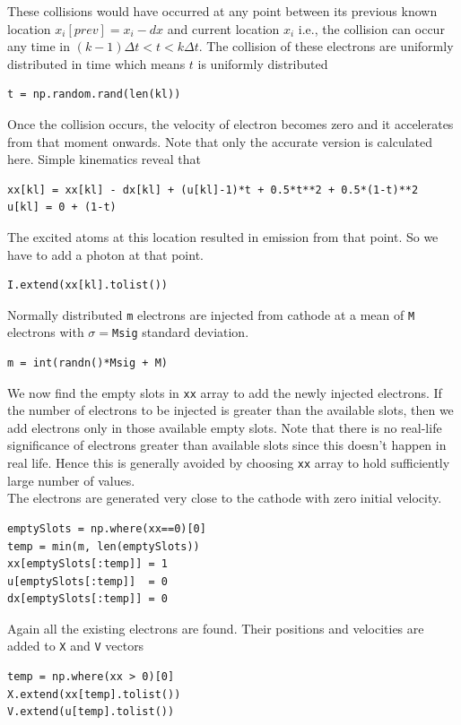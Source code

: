 \documentclass[12pt, a4paper]{report}
\begin{document}
These collisions would have occurred at any point between its previous known location $x_i[prev] = x_i - dx$ and current location $x_i$ i.e., the collision can occur any time in $(k-1) \Delta t < t < k \Delta t$. The collision of these electrons are uniformly distributed in time which means $t$ is uniformly distributed
\begin{verbatim}
t = np.random.rand(len(kl)) 
\end{verbatim}
Once the collision occurs, the velocity of electron becomes zero and it accelerates from that moment onwards. Note that only the accurate version is calculated here. Simple kinematics reveal that
\begin{verbatim}
xx[kl] = xx[kl] - dx[kl] + (u[kl]-1)*t + 0.5*t**2 + 0.5*(1-t)**2
u[kl] = 0 + (1-t)
\end{verbatim}
The excited atoms at this location resulted in emission from that point. So we have to add a photon at that point. 
\begin{verbatim}
I.extend(xx[kl].tolist())
\end{verbatim}
Normally distributed \texttt{m} electrons are injected from cathode at a mean of \texttt{M} electrons with $\sigma = $\texttt{Msig} standard deviation.
\begin{verbatim}
m = int(randn()*Msig + M)
\end{verbatim}
We now find the empty slots in \texttt{xx} array to add the newly injected electrons. If the number of electrons to be injected is greater than the available slots, then we add electrons only in those available empty slots. Note that there is no real-life significance of electrons greater than available slots since this doesn't happen in real life. Hence this is generally avoided by choosing \texttt{xx} array to hold sufficiently large number of values.\\
The electrons are generated very close to the cathode with zero initial velocity. 
\begin{verbatim}
emptySlots = np.where(xx==0)[0]
temp = min(m, len(emptySlots))
xx[emptySlots[:temp]] = 1 
u[emptySlots[:temp]]  = 0 
dx[emptySlots[:temp]] = 0 
\end{verbatim}

Again all the existing electrons are found. Their positions and velocities are added to \texttt{X} and \texttt{V} vectors
\begin{verbatim}
temp = np.where(xx > 0)[0]
X.extend(xx[temp].tolist())
V.extend(u[temp].tolist())
\end{verbatim}
\end{document}
